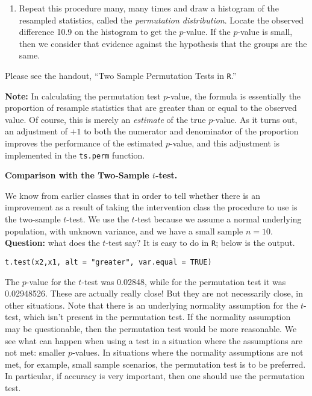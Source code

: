 \documentclass[captions=tableheading]{scrbook}
\begin{document}
\begin{enumerate}
\item Repeat this procedure many, many times and draw a histogram of the resampled statistics, called the \emph{permutation distribution}.  Locate the observed difference 10.9 on the histogram to get the $p$-value. If the $p$-value is small, then we consider that evidence against the hypothesis that the groups are the same.
\end{enumerate}
Please see the handout, ``Two Sample Permutation Tests in \texttt{R}.''

\textbf{Note:} In calculating the permutation test $p$-value, the formula is essentially the proportion of resample statistics that are greater than or equal to the observed value. Of course, this is merely an \emph{estimate} of the true $p$-value. As it turns out, an adjustment of $+1$ to both the numerator and denominator of the
proportion improves the performance of the estimated $p$-value, and this adjustment is implemented in the \texttt{ts.perm} function.

\textbf{Comparison with the Two-Sample $t$-test.}

We know from earlier classes that in order to tell whether there is an improvement as a result of taking the intervention class the procedure to use is the two-sample $t$-test. We use the $t$-test because we assume a normal underlying population, with unknown variance, and we have a small sample $n=10$. \textbf{Question:} what does the $t$-test say? It is easy to do in \texttt{R}; below is the output.

\begin{verbatim}
t.test(x2,x1, alt = "greater", var.equal = TRUE)
\end{verbatim}


The $p$-value for the $t$-test was 0.02848, while for the permutation test it was 0.02948526. These are actually really close! But they are not necessarily close, in other situations. Note that there is an underlying normality assumption for the $t$-test, which isn't present in the permutation test. If the normality assumption may be questionable, then the permutation test would be more reasonable. We see what can happen when using a test in a situation where the assumptions are not met: smaller $p$-values. In situations where the normality assumptions are not met, for example, small sample scenarios, the permutation test is to be preferred. In particular, if accuracy is very important, then one should use the permutation test.
\end{document}
